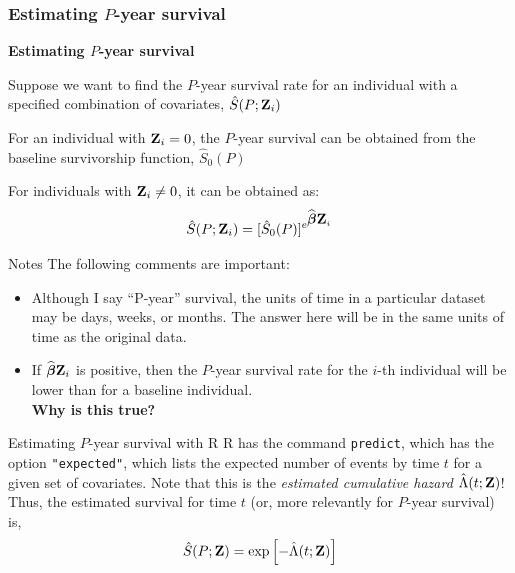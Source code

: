 \documentclass[envcountsect, 10pt, portrait, palatino]{beamer}
\newcommand{\bfbeta}{{\mbox{\boldmath$\beta$}}}
\newcommand{\bfZ}{{\mbox{{\bf Z}}}}
\begin{document}
\subsubsection{Estimating $P$-year survival}
\begin{frame}{\bf  Estimating $P$-year survival}

Suppose we want to find the $P$-year  survival rate  for an individual with a specified combination of covariates,
$\hat{S}(P;{\bfZ_i})$

\vspace{0.2in}
For an individual with ${\bfZ_i} =0$, the $P$-year survival
can be obtained from the baseline survivorship function, $\hat{S}_0(P)$

\vspace{0.2in}
For individuals with $\bfZ_i \neq 0$, it can be obtained as:
\[ \hat{S}(P;{\bfZ_i}) = [\hat{S}_0(P)]^{e^{\widehat\bfbeta \bfZ_i}} \]

\end{frame}
\begin{frame}{Notes}
The following comments are important:
\begin{itemize}
\item Although I say ``P-year'' survival, the units of time in a
particular dataset may be days, weeks, or months.  The answer here
will be in the same units of time as the original data.

\item  If $\widehat\bfbeta\bfZ_i$ is positive, then the $P$-year survival rate
for the $i$-th individual will be lower than for a baseline
individual.\\[2ex]

{\bf Why is this true?}
\end{itemize}
\end{frame}
\begin{frame}{Estimating $P$-year survival with R}
R has the command {\tt predict}, which has the option {\tt "expected"}, which lists the expected number of events by time $t$ for a given set of covariates. Note that this is the \textit{estimated cumulative hazard} $\hat{\Lambda}(t;\bfZ)$!\\[2ex]
Thus, the estimated survival for time $t$ (or, more relevantly for $P$-year survival) is, 
$$\hat{S}(P;\bfZ)=\exp\left [-\hat{\Lambda}(t;\bfZ)\right ]$$ 
\end{frame}
\end{document}
